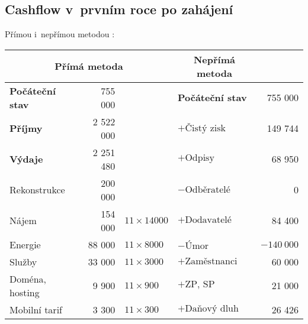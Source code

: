 \newpage

\subsection{Cashflow v~prvním roce po zahájení}
Přímou i~nepřímou metodou \cite{synek_kislingerova}:

\begin{table}[htbp]
\begin{center}
\begin{tabular}{lrllr}
\multicolumn{3}{c}{\textbf{Přímá metoda}}                               & \multicolumn{1}{c}{\textbf{Nepřímá metoda}} &                          \\ \hline
\textbf{Počáteční stav}                    & 755 000            &                   & \textbf{Počáteční stav}                           & 755 000            \\
\textbf{Příjmy}                            & 2 522 000          &                   & $+\text{Čistý zisk}$                              & 149 744            \\
\textbf{Výdaje}                            & 2 251 480          &                   & $+\text{Odpisy}$                                  & 68 950             \\
\hspace{0,5cm}Rekonstrukce                 & 200 000            &                   & $-\text{Odběratelé}$                              & 0                  \\
\hspace{0,5cm}Nájem                        & 154 000            & $11 \times 14000$ & $+\text{Dodavatelé}$                              & 84 400             \\
\hspace{0,5cm}Energie                      & 88 000             & $11 \times 8000$  & $-\text{Úmor}$                                    & $-140~000$         \\
\hspace{0,5cm}Služby                       & 33 000             & $11 \times 3000$  & $+\text{Zaměstnanci}$                             & 60 000             \\
\hspace{0,5cm}Doména, hosting              & 9 900              & $11 \times 900$   & $+\text{ZP, SP}$                                  & 21 000             \\
\hspace{0,5cm}Mobilní tarif                & 3 300              & $11 \times 300$   & $+\text{Daňový dluh}$                             & 26 426             \\

\end{tabular}
\end{center}
\end{table}
